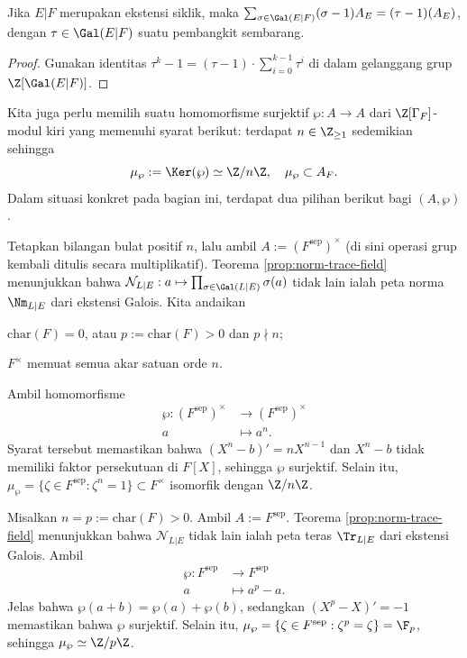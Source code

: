 \begin{lemma}\label{prop:H-minus-1-cyclic}
	Jika $E|F$ merupakan ekstensi siklik, maka $\sum_{\sigma \in \Gal(E|F)} (\sigma-1)A_E = (\tau-1)(A_E)$, dengan $\tau \in \Gal(E|F)$ suatu pembangkit sembarang.
\end{lemma}
\begin{proof}
	Gunakan identitas $\tau^k - 1 =  (\tau-1) \cdot \sum_{i=0}^{k-1} \tau^i$ di dalam gelanggang grup $\Z[\Gal(E|F)]$.
\end{proof}

Kita juga perlu memilih suatu homomorfisme surjektif $\wp: A \to A$ dari $\Z[\Gamma_F]$-modul kiri yang memenuhi syarat berikut: terdapat $n \in \Z_{\geq 1}$ sedemikian sehingga
\[ \mu_\wp := \Ker(\wp) \simeq \Z/n\Z, \quad \mu_\wp \subset A_F. \]
Dalam situasi konkret pada bagian ini, terdapat dua pilihan berikut bagi $(A, \wp)$.

\begin{example}\label{eg:Kummer-theory} 
	Tetapkan bilangan bulat positif $n$, lalu ambil $A := (F^\text{sep})^\times$ (di sini operasi grup kembali ditulis secara multiplikatif). Teorema \ref{prop:norm-trace-field} menunjukkan bahwa $\mathcal{N}_{L|E}: a \mapsto \prod_{\sigma \in \Gal(L|E)} \sigma(a)$ tidak lain ialah peta norma $\Nm_{L|E}$ dari ekstensi Galois. Kita andaikan
	\begin{compactitem}
		\item $\text{char}(F) = 0$, atau $p := \text{char}(F) > 0$ dan $p \nmid n$;
		\item $F^\times$ memuat semua akar satuan orde $n$.
	\end{compactitem}
	Ambil homomorfisme
	\begin{align*}
		\wp: (F^{\text{sep}})^\times & \longrightarrow (F^{\text{sep}})^\times \\
		a & \longmapsto a^n.
	\end{align*}
	Syarat tersebut memastikan bahwa $(X^n-b)' = nX^{n-1}$ dan $X^n-b$ tidak memiliki faktor persekutuan di $F[X]$, sehingga $\wp$ surjektif. Selain itu, $\mu_\wp = \{\zeta \in F^\text{sep}: \zeta^n = 1 \} \subset F^\times$ isomorfik dengan $\Z/n\Z$.
\end{example}

\begin{example}\label{eg:Artin-Schreier-theory} 
	Misalkan $n = p := \text{char}(F) > 0$. Ambil $A := F^\text{sep}$. Teorema \ref{prop:norm-trace-field} menunjukkan bahwa $\mathcal{N}_{L|E}$ tidak lain ialah peta teras $\Tr_{L|E}$ dari ekstensi Galois. Ambil
	\begin{align*}
		\wp: F^{\text{sep}} & \longrightarrow F^{\text{sep}} \\
		a & \longmapsto a^p - a.
	\end{align*}
	Jelas bahwa $\wp(a+b)=\wp(a)+\wp(b)$, sedangkan $(X^p - X)' = -1$ memastikan bahwa $\wp$ surjektif. Selain itu, $\mu_\wp = \{\zeta \in F^\text{sep}: \zeta^p=\zeta \} = \F_p$, sehingga $\mu_\wp \simeq \Z/p\Z$.
\end{example}

